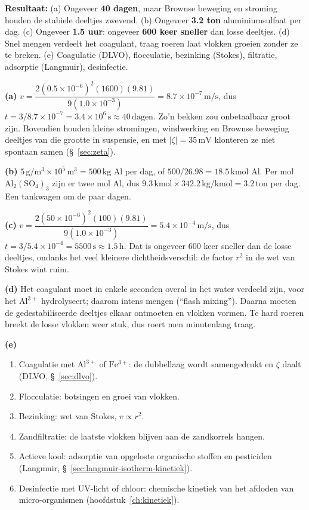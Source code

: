 \begin{oplossing}
\textbf{Resultaat:} (a) Ongeveer \textbf{40 dagen}, maar Brownse beweging en stroming houden de stabiele deeltjes zwevend. (b) Ongeveer \textbf{3.2 ton} aluminiumsulfaat per dag. (c) Ongeveer \textbf{1.5 uur}: ongeveer \textbf{600 keer sneller} dan losse deeltjes. (d) Snel mengen verdeelt het coagulant, traag roeren laat vlokken groeien zonder ze te breken. (e) Coagulatie (DLVO), flocculatie, bezinking (Stokes), filtratie, adsorptie (Langmuir), desinfectie.

\textbf{(a)} \(v = \dfrac{2(0.5\times10^{-6})^2(1600)(9.81)}{9(1.0\times10^{-3})} = 8.7\times10^{-7}\,\mathrm{m/s}\), dus \(t = 3/8.7\times10^{-7} = 3.4\times10^{6}\,\mathrm{s} \approx 40\,\mathrm{dagen}\). Zo'n bekken zou onbetaalbaar groot zijn. Bovendien houden kleine stromingen, windwerking en Brownse beweging deeltjes van die grootte in suspensie, en met \(|\zeta| = 35\,\mathrm{mV}\) klonteren ze niet spontaan samen (\S~\ref{sec:zeta}).

\textbf{(b)} \(5\,\mathrm{g/m^3} \times 10^{5}\,\mathrm{m^3} = 500\,\mathrm{kg}\) Al per dag, of \(500/26.98 = 18.5\,\mathrm{kmol}\) Al. Per mol \(\mathrm{Al_2(SO_4)_3}\) zijn er twee mol Al, dus \(9.3\,\mathrm{kmol} \times 342.2\,\mathrm{kg/kmol} = 3.2\,\mathrm{ton}\) per dag. Een tankwagen om de paar dagen.

\textbf{(c)} \(v = \dfrac{2(50\times10^{-6})^2(100)(9.81)}{9(1.0\times10^{-3})} = 5.4\times10^{-4}\,\mathrm{m/s}\), dus \(t = 3/5.4\times10^{-4} = 5500\,\mathrm{s} \approx 1.5\,\mathrm{h}\). Dat is ongeveer 600 keer sneller dan de losse deeltjes, ondanks het veel kleinere dichtheidsverschil: de factor \(r^2\) in de wet van Stokes wint ruim.

\textbf{(d)} Het coagulant moet in enkele seconden overal in het water verdeeld zijn, voor het \(\mathrm{Al^{3+}}\) hydrolyseert; daarom intens mengen (``flash mixing''). Daarna moeten de gedestabiliseerde deeltjes elkaar ontmoeten en vlokken vormen. Te hard roeren breekt de losse vlokken weer stuk, dus roert men minutenlang traag.

\textbf{(e)}

\begin{enumerate}
\item[(a)]
  Coagulatie met \(\mathrm{Al^{3+}}\) of \(\mathrm{Fe^{3+}}\): de dubbellaag wordt samengedrukt en \(\zeta\) daalt (DLVO, \S~\ref{sec:dlvo}).
\item[(b)]
  Flocculatie: botsingen en groei van vlokken.
\item[(c)]
  Bezinking: wet van Stokes, \(v \propto r^2\).
\item[(d)]
  Zandfiltratie: de laatste vlokken blijven aan de zandkorrels hangen.
\item[(e)]
  Actieve kool: adsorptie van opgeloste organische stoffen en pesticiden (Langmuir, \S~\ref{sec:langmuir-isotherm-kinetiek}).
\item[(f)]
  Desinfectie met UV-licht of chloor: chemische kinetiek van het afdoden van micro-organismen (hoofdstuk~\ref{ch:kinetiek}).
\end{enumerate}
\end{oplossing}

